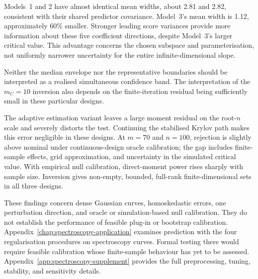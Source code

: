 Models~1 and 2 have almost identical mean widths, about 2.81 and 2.82,
consistent with their shared predictor covariance.  Model~3's mean width
is 1.12, approximately 60\% smaller.  Stronger leading score variances
provide more information about these five coefficient directions, despite
Model~3's larger critical value.  This advantage concerns the chosen
subspace and parameterisation, not uniformly narrower uncertainty for the
entire infinite-dimensional slope.

Neither the median envelope nor
the representative boundaries should be interpreted as a realised
simultaneous confidence band.  The interpretation of the $m_C=10$ inversion
also depends on the finite-iteration residual being sufficiently small in
these particular designs.

The adaptive estimation variant leaves a large moment residual on the root-$n$
scale and severely distorts the test.  Continuing the stabilised Krylov path
makes this error negligible in these designs.  At $m=70$ and $n=100$,
rejection is slightly above nominal under continuous-design oracle
calibration; the gap includes finite-sample effects, grid approximation, and
uncertainty in the simulated critical value.  With empirical null calibration, direct-moment power rises sharply
with sample size.  Inversion gives non-empty, bounded, full-rank
finite-dimensional sets in all three designs.

These findings concern dense Gaussian curves, homoskedastic errors, one
perturbation direction, and oracle or simulation-based null calibration.
They do not establish the performance of feasible plug-in or bootstrap
calibration.  Appendix~\ref{chap:spectroscopy-application} examines prediction
with the four regularisation procedures on spectroscopy curves.  Formal
testing there would require feasible calibration whose finite-sample
behaviour has yet to be assessed.  Appendix~\ref{app:spectroscopy-supplement}
provides the full preprocessing, tuning, stability, and sensitivity details.
